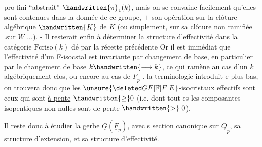
pro-fini ``abstrait'' $\handwritten{\pi}_1(k)$, mais on se convainc facilement qu'elles sont contenues dans la donnée de ce groupe, $+$ son opération sur la clôture algébrique $\handwritten{\bar{K}}$ de $K$ (ou simplement, sur sa clôture non ramifiée .sur $W$ ...). - Il resterait enfin à déterminer la structure d'effectivité dans la catégorie $\mathrm{Fcriso}(k)$ dé par la récette précédente Or il est immédiat que l'effectivité d'un F-isocstal est invariante par changement de base, en particulier par le changement de base $k\handwritten{\longrightarrow\bar{k}}$, ce qui ramène au cas d'un $k$ algébriquement clos, ou encore au cas de $\underline{F}_p$ .   la terminologie introduit e plus bas, on trouvera donc que les $\unsure{\deleted G F|\mathbb{F}|F|E}$-isocristaux effectifs sont ceux qui sont \uline{à pente} $\handwritten{\geq}0$ (i.e. dont tout es les composantes isopentiques  non nulles sont de pente $\handwritten{>}\ 0$).

 Il reste donc à étudier la gerbe $\underline{G}(\underline{F}_p)$, avec s  section canonique sur $\underline{Q}_p$, sa structure d'extension, et sa structure d'effectivité.

